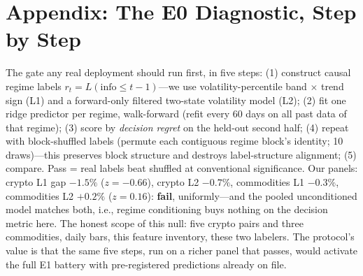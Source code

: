 \documentclass[10pt]{article}
\begin{document}
\section{Appendix: The E0 Diagnostic, Step by Step}
\label{app:e0}

The gate any real deployment should run first, in five steps: (1)
construct causal regime labels $r_t = L(\text{info} \le t{-}1)$---we use
volatility-percentile band $\times$ trend sign (L1) and a forward-only
filtered two-state volatility model (L2); (2) fit one ridge predictor per
regime, walk-forward (refit every 60 days on all past data of that
regime); (3) score by \emph{decision regret} on the held-out second half;
(4) repeat with block-shuffled labels (permute each contiguous regime
block's identity; 10 draws)---this preserves block structure and
destroys label-structure alignment; (5) compare. Pass = real labels beat
shuffled at conventional significance. Our panels: crypto L1 gap
$-1.5\%$ ($z = -0.66$), crypto L2 $-0.7\%$, commodities L1 $-0.3\%$,
commodities L2 $+0.2\%$ ($z = 0.16$): \textbf{fail}, uniformly---and the
pooled unconditioned model matches both, i.e., regime conditioning buys
nothing on the decision metric here. The honest scope of this null: five
crypto pairs and three commodities, daily bars, this feature inventory,
these two labelers. The protocol's value is that the same five steps,
run on a richer panel that passes, would activate the full E1 battery
with pre-registered predictions already on file.



\end{document}
